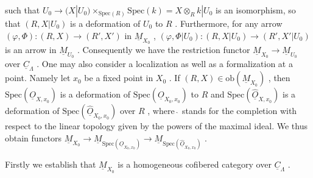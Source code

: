 \begin{center}
\end{center}
such that  $U_0 \to (X|U_0) \times_{\mathrm{Spec}(R)} \mathrm{Spec}(k) = X \otimes_R k|U_0$  is an isomorphism, so that $(R, X|U_0)$  is a deformation of  $U_0$  to  $R$ . Furthermore, for any arrow $(\varphi, \Phi) : (R, X) \to (R', X')$  in  $\underline{M}_{X_0}$ ,  $(\varphi, \Phi|U_0) : (R, X|U_0) \to (R', X'|U_0)$  is an arrow in  $\underline{M}_{U_0}$ . Consequently we have the restriction functor  $\underline{M}_{X_0} \to \underline{M}_{U_0}$  over $\underline{C}_\Lambda$ . One may also consider a localization as well as a formalization at a point. Namely let  $x_0$  be a fixed point in  $X_0$ . If  $(R, X) \in \mathrm{ob}(\underline{M}_{X_0})$ , then $\mathrm{Spec}(\underline{O}_{X,x_0})$  is a deformation of  $\mathrm{Spec}(\underline{O}_{X_0,x_0})$  to  $R$  and  $\mathrm{Spec}(\hat{\underline{O}}_{X,x_0})$  is a deformation of  $\mathrm{Spec}(\hat{\underline{O}}_{X_0,x_0})$  over  $R$ , where  $\hat{\ }$  stands for the completion with respect to the linear topology given by the powers of the maximal ideal. We thus obtain functors  $\underline{M}_{X_0} \to \underline{M}_{\mathrm{Spec}(\underline{O}_{X_0,x_0})} \to \underline{M}_{\mathrm{Spec}(\hat{\underline{O}}_{X_0,x_0})}$ .

Firstly we establish that  $\underline{M}_{X_0}$  is a homogeneous cofibered category over $\underline{C}_\Lambda$ .

